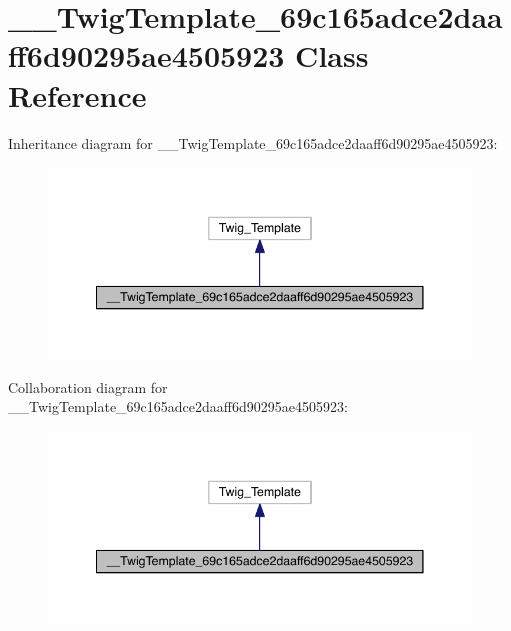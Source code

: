 \hypertarget{class_____twig_template__69c165adce2daaff6d90295ae4505923}{\section{\-\_\-\-\_\-\-Twig\-Template\-\_\-69c165adce2daaff6d90295ae4505923 Class Reference}
\label{class_____twig_template__69c165adce2daaff6d90295ae4505923}
}


Inheritance diagram for \-\_\-\-\_\-\-Twig\-Template\-\_\-69c165adce2daaff6d90295ae4505923\-:
\nopagebreak
\begin{figure}[H]
\begin{center}
\leavevmode
\includegraphics[width=344pt]{class_____twig_template__69c165adce2daaff6d90295ae4505923__inherit__graph}
\end{center}
\end{figure}


Collaboration diagram for \-\_\-\-\_\-\-Twig\-Template\-\_\-69c165adce2daaff6d90295ae4505923\-:
\nopagebreak
\begin{figure}[H]
\begin{center}
\leavevmode
\includegraphics[width=344pt]{class_____twig_template__69c165adce2daaff6d90295ae4505923__coll__graph}
\end{center}
\end{figure}
